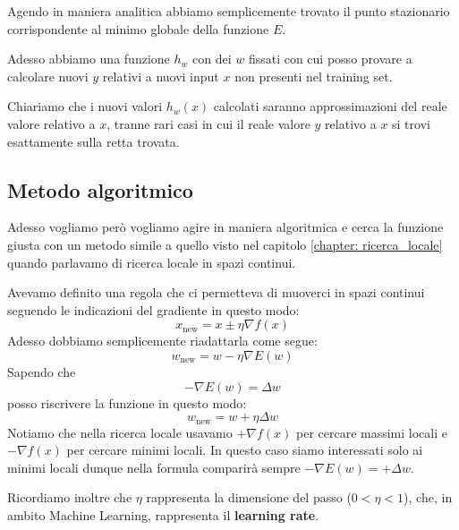 Agendo in maniera analitica abbiamo semplicemente trovato il punto stazionario corrispondente al minimo globale della
funzione $E$.

Adesso abbiamo una funzione $h_w$ con dei $w$ fissati con cui posso provare a calcolare nuovi $y$ relativi a nuovi
input $x$ non presenti nel training set.

Chiariamo che i nuovi valori $h_w(x)$ calcolati saranno approssimazioni del reale valore relativo a $x$, tranne rari casi
in cui il reale valore $y$ relativo a $x$ si trovi esattamente sulla retta trovata.

\subsection{Metodo algoritmico}
Adesso vogliamo per\`o vogliamo agire in maniera algoritmica e cerca la funzione giusta con un metodo simile a quello
visto nel capitolo \ref{chapter: ricerca_locale} quando parlavamo di ricerca locale in spazi continui.

Avevamo definito una regola che ci permetteva di muoverci in spazi continui seguendo le indicazioni del gradiente in questo
modo:
\[ x_{\text{new}} = x \pm \eta \nabla f(x) \]
Adesso dobbiamo semplicemente riadattarla come segue:
\[ w_{\text{new}} = w - \eta \nabla E(w) \]
Sapendo che
\[ -\nabla E(w) = \Delta w \]
posso riscrivere la funzione in questo modo:
\[ w_{\text{new}} = w + \eta \Delta w \]
Notiamo che nella ricerca locale usavamo $+\nabla f(x)$ per cercare massimi locali e $-\nabla f(x)$ per cercare
minimi locali. In questo caso siamo interessati solo ai minimi locali dunque nella formula comparir\`a sempre
$-\nabla E(w) = +\Delta w$.

Ricordiamo inoltre che $\eta$ rappresenta la dimensione del passo ($0 < \eta < 1$), che, in ambito Machine Learning,
rappresenta il \textbf{learning rate}.


